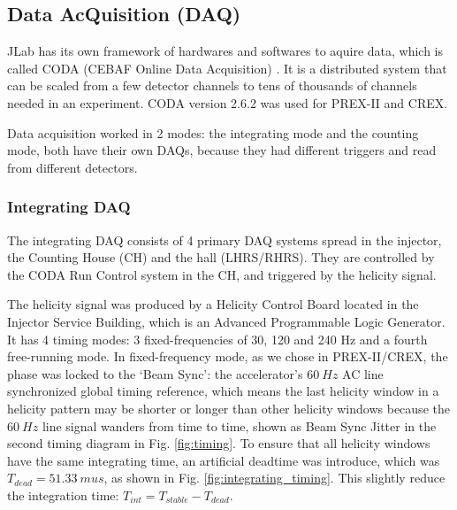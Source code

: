 \subsection{Data AcQuisition (DAQ)}
JLab has its own framework of hardwares and softwares to aquire data, which
is called CODA (CEBAF Online Data Acquisition) \cite{CODA}. It is a distributed
system that can be scaled from a few detector channels to tens of thousands of
channels needed in an experiment. CODA version 2.6.2 was used for PREX-II and CREX.

Data acquisition worked in 2 modes: the integrating mode and the counting mode,
both have their own DAQs, because they had different triggers and read from
different detectors.

\subsubsection{Integrating DAQ}
The integrating DAQ consists of 4 primary DAQ systems spread in the injector,
the Counting House (CH) and the hall (LHRS/RHRS). They are controlled by the
CODA Run Control system in the CH, and triggered by the helicity signal.

The helicity signal was produced by a Helicity Control Board \cite{Hboard} 
located in the Injector Service Building, which is an Advanced Programmable Logic
Generator. It has 4 timing modes: 3 fixed-frequencies of 30, 120 and 240 Hz
and a fourth free-running mode. In fixed-frequency mode, as we chose in PREX-II/CREX,
the phase was locked to the `Beam Sync': the accelerator's $60\ Hz$ AC line synchronized 
global timing reference, which means the last helicity window in a helicity pattern
may be shorter or longer than other helicity windows because the $60\ Hz$ line signal
wanders from time to time, shown as Beam Sync Jitter in the second timing diagram 
in Fig. \ref{fig:timing}. To ensure that all helicity windows have the same integrating
time, an artificial deadtime was introduce, which was $T_{dead} = 51.33\ mu s$,
as shown in Fig. \ref{fig:integrating_timing}.
This slightly reduce the integration time: $T_{int} = T_{stable} - T_{dead}$.


